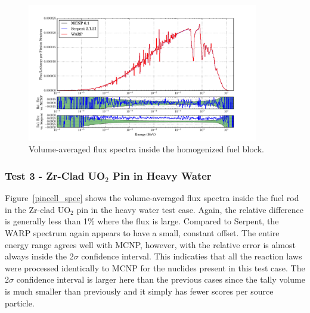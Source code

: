 \documentclass[preprint,12pt]{elsarticle}
\begin{document}
\begin{figure}[!htbp]
\centering
\includegraphics[width=0.9\textwidth,trim= 1cm 0cm 1cm 0cm]{graphics/homfuel_spec.pdf}
\caption{Volume-averaged flux spectra inside the homogenized fuel block. \label{homfuel_spec} }
\end{figure}

\newpage
\subsubsection{Test 3 - Zr-Clad UO$_2$ Pin in Heavy Water}

Figure~\ref{pincell_spec} shows the volume-averaged flux spectra inside the fuel rod in the Zr-clad UO$_2$ pin in the heavy water test case.  Again, the relative difference is generally less than 1\% where the flux is large.  Compared to Serpent, the WARP spectrum again appears to have a small, constant offset.  The entire energy range agrees well with MCNP, however, with the relative error is almost always inside the 2$\sigma$ confidence interval.  This indicaties that all the reaction laws were processed identically to MCNP for the nuclides present in this test case.  The 2$\sigma$ confidence interval is larger here than the previous cases since the tally volume is much smaller than previously and it simply has fewer scores per source particle.

\end{document}
